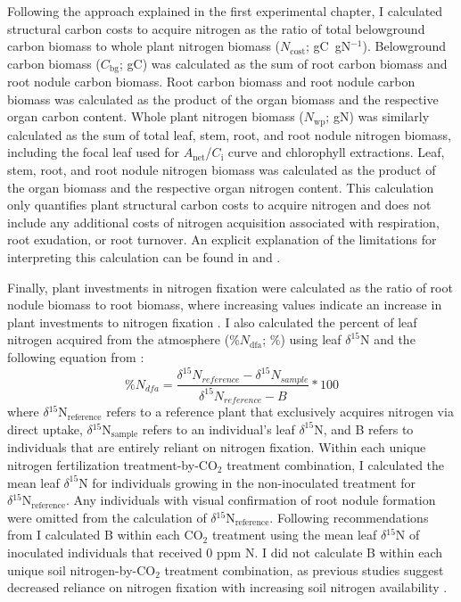 Following the approach explained in the first experimental chapter, I calculated structural carbon costs to acquire nitrogen as the ratio of total belowground carbon biomass to whole plant nitrogen biomass ($N_\mathrm{cost}$; gC\ gN$^{-1}$). Belowground carbon biomass ($C_\mathrm{bg}$; gC) was calculated as the sum of root carbon biomass and root nodule carbon biomass. Root carbon biomass and root nodule carbon biomass was calculated as the product of the organ biomass and the respective organ carbon content. Whole plant nitrogen biomass ($N_\mathrm{wp}$; gN) was similarly calculated as the sum of total leaf, stem, root, and root nodule nitrogen biomass, including the focal leaf used for $A_\mathrm{net}$/$C_\mathrm{i}$ curve and chlorophyll extractions. Leaf, stem, root, and root nodule nitrogen biomass was calculated as the product of the organ biomass and the respective organ nitrogen content. This calculation only quantifies plant structural carbon costs to acquire nitrogen and does not include any additional costs of nitrogen acquisition associated with respiration, root exudation, or root turnover. An explicit explanation of the limitations for interpreting this calculation can be found in  and .

Finally, plant investments in nitrogen fixation were calculated as the ratio of root nodule biomass to root biomass, where increasing values indicate an increase in plant investments to nitrogen fixation . I also calculated the percent of leaf nitrogen acquired from the atmosphere (\%$N_\mathrm{dfa}$; \%) using leaf $\delta^{15}$N and the following equation from :
\begin{equation} \label{eqn_5.11}
    \%N_{dfa} = \frac{\delta^{15}N{}_{reference} - \delta^{15}N{}_{sample}}{\delta^{15}N{}_{reference} - B}*100
\end{equation}
\noindent where $\delta\mathrm{^{15}{N}_{reference}}$ refers to a reference plant that exclusively acquires nitrogen via direct uptake, $\delta\mathrm{^{15}{N}_{sample}}$ refers to an individual’s leaf $\delta^{15}$N, and B refers to individuals that are entirely reliant on nitrogen fixation. Within each unique nitrogen fertilization treatment-by-CO$_2$ treatment combination, I calculated the mean leaf $\delta^{15}$N for individuals growing in the non-inoculated treatment for $\delta\mathrm{^{15}{N}_{reference}}$. Any individuals with visual confirmation of root nodule formation were omitted from the calculation of $\delta\mathrm{^{15}{N}_{reference}}$. Following recommendations from  I calculated B within each CO$_2$ treatment using the mean leaf $\delta\mathrm{^{15}{N}}$ of inoculated individuals that received 0 ppm N. I did not calculate B within each unique soil nitrogen-by-CO$_2$ treatment combination, as previous studies suggest decreased reliance on nitrogen fixation with increasing soil nitrogen availability .

